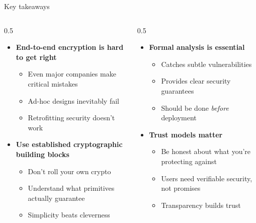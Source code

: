 \ifdefined\PRESENTATION\else\PassOptionsToClass{handout}{beamer}\fi\documentclass[aspectratio=169, lualatex]{beamer}
\begin{document}
\begin{frame}{Key takeaways}
	\begin{columns}[c]
		\begin{column}{0.5\textwidth}
			\begin{itemize}
				\item \textbf{End-to-end encryption is hard to get right}
				      \begin{itemize}
					      \item Even major companies make critical mistakes
					      \item Ad-hoc designs inevitably fail
					      \item Retrofitting security doesn't work
				      \end{itemize}
				\item \textbf{Use established cryptographic building blocks}
				      \begin{itemize}
					      \item Don't roll your own crypto
					      \item Understand what primitives actually guarantee
					      \item Simplicity beats cleverness
				      \end{itemize}
			\end{itemize}
		\end{column}
		\begin{column}{0.5\textwidth}
			\begin{itemize}
				\item \textbf{Formal analysis is essential}
				      \begin{itemize}
					      \item Catches subtle vulnerabilities
					      \item Provides clear security guarantees
					      \item Should be done \textit{before} deployment
				      \end{itemize}
				\item \textbf{Trust models matter}
				      \begin{itemize}
					      \item Be honest about what you're protecting against
					      \item Users need verifiable security, not promises
					      \item Transparency builds trust
				      \end{itemize}
			\end{itemize}
		\end{column}
	\end{columns}
\end{frame}
\end{document}
